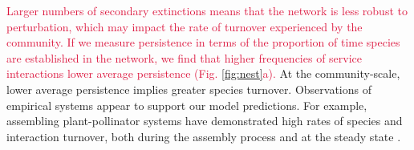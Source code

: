 \documentclass[twocolumn,preprintnumbers,amsmath,amssymb,superscriptaddress,linenumbers]{revtex4-1}
\newcommand{\rev}[1]{\textcolor{crimson}{#1}}
\begin{document}
\rev{Larger numbers of secondary extinctions means that the network is less robust to perturbation, which may impact the rate of turnover experienced by the community.
If we measure persistence in terms of the proportion of time species are established in the network, we find that higher frequencies of service interactions lower average persistence (Fig. \ref{fig:nest}a).}
At the community-scale, lower average persistence implies greater species turnover.
Observations of empirical systems appear to support our model predictions.
For example, assembling plant-pollinator systems have demonstrated high rates of species and interaction turnover, both during the assembly process and at the steady state \cite{Ponisio2017}.

\end{document}
